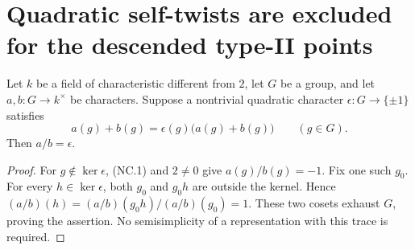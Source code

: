 \section{Quadratic self-twists are excluded for the descended type-II points}
\label{sec:cubic-typeii-noncm}

\begin{lemma}
\label{AC-K29-nonCM-trace}
Let $k$ be a field of characteristic different from $2$, let
$G$ be a group, and let $a,b:G\to k^\times$ be characters.
Suppose a nontrivial quadratic character $\epsilon:G\to\{\pm1\}$
satisfies
\[
       a(g)+b(g)=\epsilon(g)\bigl(a(g)+b(g)\bigr)
                         \qquad(g\in G).                 \tag{NC.1}
\]
Then $a/b=\epsilon$.
\end{lemma}
\begin{proof}
For $g\notin\ker\epsilon$, (NC.1) and $2\ne0$ give
$a(g)/b(g)=-1$.  Fix one such $g_0$.  For every
$h\in\ker\epsilon$, both $g_0$ and $g_0h$ are outside
the kernel.  Hence
$(a/b)(h)=(a/b)(g_0h)/(a/b)(g_0)=1$.
These two cosets exhaust $G$, proving the assertion.
No semisimplicity of a representation with this trace is required.
\end{proof}


